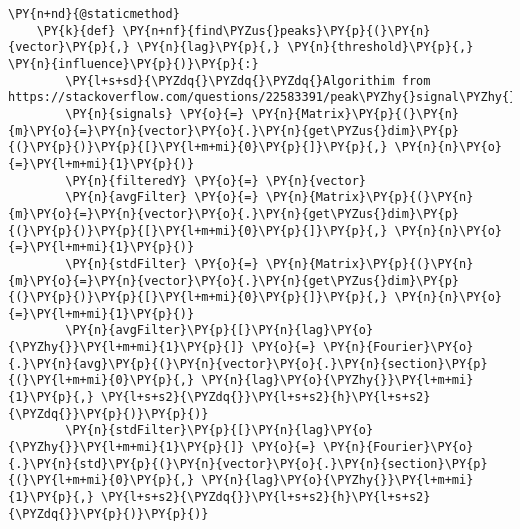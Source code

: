 \begin{Verbatim}[commandchars=\\\{\}]
    \PY{n+nd}{@staticmethod}
    \PY{k}{def} \PY{n+nf}{find\PYZus{}peaks}\PY{p}{(}\PY{n}{vector}\PY{p}{,} \PY{n}{lag}\PY{p}{,} \PY{n}{threshold}\PY{p}{,} \PY{n}{influence}\PY{p}{)}\PY{p}{:}
        \PY{l+s+sd}{\PYZdq{}\PYZdq{}\PYZdq{}Algorithim from https://stackoverflow.com/questions/22583391/peak\PYZhy{}signal\PYZhy{}detection\PYZhy{}in\PYZhy{}realtime\PYZhy{}timeseries\PYZhy{}data/22640362\PYZsh{}22640362\PYZdq{}\PYZdq{}\PYZdq{}}
        \PY{n}{signals} \PY{o}{=} \PY{n}{Matrix}\PY{p}{(}\PY{n}{m}\PY{o}{=}\PY{n}{vector}\PY{o}{.}\PY{n}{get\PYZus{}dim}\PY{p}{(}\PY{p}{)}\PY{p}{[}\PY{l+m+mi}{0}\PY{p}{]}\PY{p}{,} \PY{n}{n}\PY{o}{=}\PY{l+m+mi}{1}\PY{p}{)}
        \PY{n}{filteredY} \PY{o}{=} \PY{n}{vector}
        \PY{n}{avgFilter} \PY{o}{=} \PY{n}{Matrix}\PY{p}{(}\PY{n}{m}\PY{o}{=}\PY{n}{vector}\PY{o}{.}\PY{n}{get\PYZus{}dim}\PY{p}{(}\PY{p}{)}\PY{p}{[}\PY{l+m+mi}{0}\PY{p}{]}\PY{p}{,} \PY{n}{n}\PY{o}{=}\PY{l+m+mi}{1}\PY{p}{)}
        \PY{n}{stdFilter} \PY{o}{=} \PY{n}{Matrix}\PY{p}{(}\PY{n}{m}\PY{o}{=}\PY{n}{vector}\PY{o}{.}\PY{n}{get\PYZus{}dim}\PY{p}{(}\PY{p}{)}\PY{p}{[}\PY{l+m+mi}{0}\PY{p}{]}\PY{p}{,} \PY{n}{n}\PY{o}{=}\PY{l+m+mi}{1}\PY{p}{)}
        \PY{n}{avgFilter}\PY{p}{[}\PY{n}{lag}\PY{o}{\PYZhy{}}\PY{l+m+mi}{1}\PY{p}{]} \PY{o}{=} \PY{n}{Fourier}\PY{o}{.}\PY{n}{avg}\PY{p}{(}\PY{n}{vector}\PY{o}{.}\PY{n}{section}\PY{p}{(}\PY{l+m+mi}{0}\PY{p}{,} \PY{n}{lag}\PY{o}{\PYZhy{}}\PY{l+m+mi}{1}\PY{p}{,} \PY{l+s+s2}{\PYZdq{}}\PY{l+s+s2}{h}\PY{l+s+s2}{\PYZdq{}}\PY{p}{)}\PY{p}{)}
        \PY{n}{stdFilter}\PY{p}{[}\PY{n}{lag}\PY{o}{\PYZhy{}}\PY{l+m+mi}{1}\PY{p}{]} \PY{o}{=} \PY{n}{Fourier}\PY{o}{.}\PY{n}{std}\PY{p}{(}\PY{n}{vector}\PY{o}{.}\PY{n}{section}\PY{p}{(}\PY{l+m+mi}{0}\PY{p}{,} \PY{n}{lag}\PY{o}{\PYZhy{}}\PY{l+m+mi}{1}\PY{p}{,} \PY{l+s+s2}{\PYZdq{}}\PY{l+s+s2}{h}\PY{l+s+s2}{\PYZdq{}}\PY{p}{)}\PY{p}{)}
        

\end{Verbatim}
